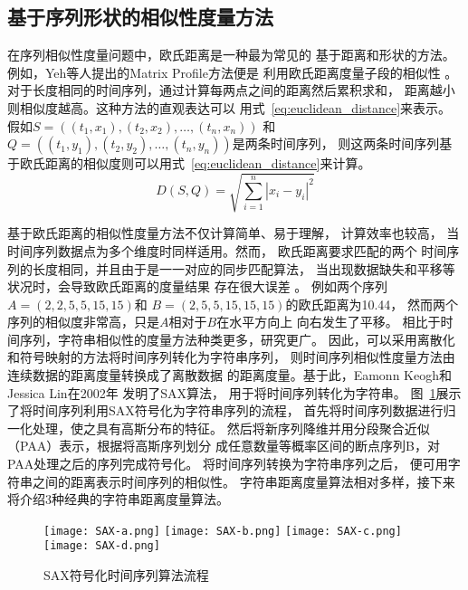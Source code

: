 \subsection{基于序列形状的相似性度量方法}
在序列相似性度量问题中，欧氏距离是一种最为常见的
基于距离和形状的方法。
例如，Yeh等人提出的Matrix Profile方法便是
利用欧氏距离度量子段的相似性
\cite{DBLP:conf/icdm/YehZUBDDSMK16}。
对于长度相同的时间序列，通过计算每两点之间的距离然后累积求和，
距离越小则相似度越高。这种方法的直观表达可以
用式~\ref{eq:euclidean_distance}来表示。
假如$S=\left(\left(t_1,x_1 \right),\left(t_2,x_2\right),\dots,\left(t_n,x_n\right)\right)$
和$Q=\left(\left(t_1,y_1 \right),\left(t_2,y_2\right),\dots,\left(t_n,y_n\right)\right)$是两条时间序列，
则这两条时间序列基于欧氏距离的相似度则可以用式~\ref{eq:euclidean_distance}来计算。
\begin{equation}
  D\left(S,Q\right) = \sqrt{\sum_{i=1}^{n}{\left| x_{i}-y_{i} \right|^{2}}}
  \label{eq:euclidean_distance}
\end{equation}

基于欧氏距离的相似性度量方法不仅计算简单、易于理解，
计算效率也较高，
当时间序列数据点为多个维度时同样适用。然而，
欧氏距离要求匹配的两个
时间序列的长度相同，并且由于是一一对应的同步匹配算法，
当出现数据缺失和平移等状况时，会导致欧氏距离的度量结果
存在很大误差
\cite{DBLP:journals/pvldb/DingTSWK08}。
例如两个序列$A=\left(2,2,5,5,15,15\right)$和
$B=\left(2,5,5,15,15,15\right)$的欧氏距离为10.44，
然而两个序列的相似度非常高，只是$A$相对于$B$在水平方向上
向右发生了平移。
相比于时间序列，字符串相似性的度量方法种类更多，研究更广。
因此，可以采用离散化和符号映射的方法将时间序列转化为字符串序列，
则时间序列相似性度量方法由连续数据的距离度量转换成了离散数据
的距离度量。基于此，Eamonn Keogh和Jessica Lin在2002年
发明了SAX算法\cite{DBLP:conf/dmkd/LinKLC03}，
用于将时间序列转化为字符串。
图~\ref{fig:SAX}展示了将时间序列利用SAX符号化为字符串序列的流程，
首先将时间序列数据进行归一化处理，使之具有高斯分布的特征。
然后将新序列降维并用分段聚合近似（PAA）表示，根据将高斯序列划分
成任意数量等概率区间的断点序列B，对PAA处理之后的序列完成符号化。
将时间序列转换为字符串序列之后，
便可用字符串之间的距离表示时间序列的相似性。
字符串距离度量算法相对多样，接下来将介绍3种经典的字符串距离度量算法。
\begin{figure}
  \centering
    {\texttt{[image: SAX-a.png]}}
    {\texttt{[image: SAX-b.png]}}
    {\texttt{[image: SAX-c.png]}}
    {\texttt{[image: SAX-d.png]}}
  \caption{SAX符号化时间序列算法流程}
  \label{fig:SAX}
\end{figure}

